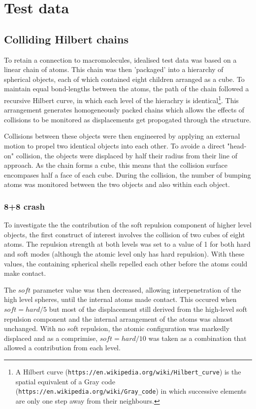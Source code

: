 \section{Test data}

\subsection{Colliding Hilbert chains}

To retain a connection to macromolecules, idealised test data was based on a linear chain of atoms.
This chain was then 'packaged' into a hierarchy of spherical objects, each of which contained
eight children arranged as a cube.   To maintain equal bond-lengths between the atoms, the path of the
chain followed a recursive Hilbert curve, in which each level of the hierachry is identical\footnote{
A Hilbert curve ({\tt https://en.wikipedia.org/wiki/Hilbert\_curve}) is the spatial equivalent of a 
Gray code ({\tt https://en.wikipedia.org/wiki/Gray\_code}) in which successive elements are
only one step away from their neighbours.
}.   This arrangement generates homogeneously packed chains which allows the effects of collisions
to be monitored as displacements get propogated through the structure.

Collisions between these objects were then engineered by applying an external
motion to propel two identical objects into each other.   To avoide a direct "head-on"
collision, the objects were displaced by half their radius from their line of approach.
As the chain forms a cube, this means that the collision surface encompases
half a face of each cube.
During the collision, the number of bumping atoms was monitored between the two objects
and also within each object.

\subsubsection{8+8 crash}

To investigate the the contribution of the soft repulsion component of higher level objects,
the first construct of interest involves the collision of two cubes of eight atoms.  The
repulsion strength at both levels was set to a value of 1 for both hard and soft modes
(although the atomic level only has hard repulsion).   With these values, the containing
spherical shells repelled each other before the atoms could make contact.

The $soft$ parameter value was then decreased, allowing interpenetration of the high
level spheres,  until the internal atoms made contact.   This occured when $soft = hard/5$
but most of the displacement still derived from the high-level soft repulsion component
and the internal arrangement of the atoms was almost unchanged.   With no soft repulsion,
the atomic configuration was markedly displaced and as a comprimise, $soft = hard/10$
was taken as a combination that allowed a contribution from each level.

